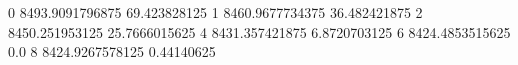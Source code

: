 0 8493.9091796875 69.423828125
1 8460.9677734375 36.482421875
2 8450.251953125 25.7666015625
4 8431.357421875 6.8720703125
6 8424.4853515625 0.0
8 8424.9267578125 0.44140625
